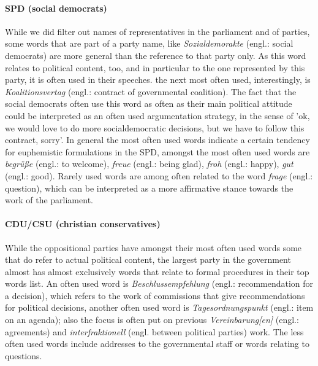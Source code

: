 \documentclass{article} %
\begin{document}
\paragraph{SPD (social democrats)}
While we did filter out names of representatives in the parliament and of parties, some words that are part of a party name, like {\em Sozialdemorakte} (engl.: social democrats) are more general than the reference to that party only. As this word relates to political content, too, and in particular to the one represented by this party, it is often used in their speeches. the next most often used, interestingly, is {\em Koalitionsvertag} (engl.: contract of governmental coalition). The fact that the social democrats often use this word as often as their main political attitude could be interpreted as an often used argumentation strategy, in the sense of 'ok, we would love to do more socialdemocratic decisions, but we have to follow this contract, sorry'. In general the most often used words indicate a certain tendency for euphemistic formulations in the SPD, amongst the most often used words are {\em begr\"u\ss{}e} (engl.: to welcome), {\em freue} (engl.: being glad), {\em froh} (engl.: happy), {\em gut} (engl.: good). Rarely used words are among often related to the word {\em frage} (engl.: question), which can be interpreted as a more affirmative stance towards the work of the parliament. 

\paragraph{CDU/CSU (christian conservatives)}
While the oppositional parties have amongst their most often used words some that do refer to actual political content, the largest party in the government almost has almost exclusively words that relate to formal procedures in their top words list. An often used word is {\em Beschlussempfehlung} (engl.: recommendation for a decision), which refers to the work of commissions that give recommendations for political decisions, another often used word is {\em Tagesordnungspunkt} (engl.: item on an agenda); also the focus is often put on previous {\em Vereinbarung[en]} (engl.: agreements) and {\em interfraktionell} (engl. between political parties) work. The less often used words include addresses to the governmental staff or words relating to questions. 
\end{document}

